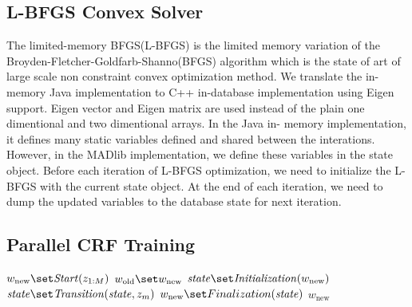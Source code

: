\subsection{L-BFGS Convex Solver}

The limited-memory BFGS(L-BFGS) \cite{DBLP:journals/siamjo/MoralesN00} is the
limited memory variation of the Broyden-Fletcher-Goldfarb-Shanno(BFGS) algorithm
which is the state of art of large scale non constraint convex optimization
method. We translate the in-memory Java implementation to C++ in-database
implementation using Eigen support. Eigen vector and Eigen matrix are used
instead of the plain one dimentional and two dimentional arrays. In the Java in-
memory implementation, it defines many static variables defined and shared
between the interations. However, in the MADlib implementation, we define these
variables in the state object. Before each iteration of L-BFGS optimization, we
need to initialize the L-BFGS with the current state object.  At the end of each
iteration, we need to dump the updated variables to the database state for next
iteration.


\subsection{Parallel CRF Training}
\begin{algorithm} \label{alg:CRF training}
\begin{algorithmic}[1]
	\State $w_\text{new} \set \mathit{Start}(z_{1:M})$
	\Repeat
        \State $w_\text{old} \set w_\text{new}$
        \State $\mathit{state} \set \mathit{Initialization}(w_\text{new})$
		 
			\State $\mathit{state} \set \mathit{Transition}(\mathit{state}, z_m)$
		\EndFor
		\State $w_\text{new} \set Finalization(\mathit{state})$ 
    \State \Return $w_\text{new}$
\end{algorithmic}
\end{algorithm}

